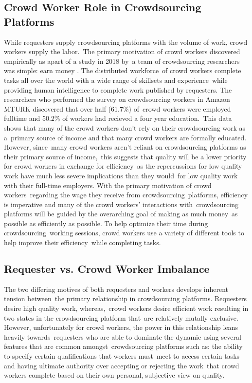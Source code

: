 \documentclass[letterpaper,12pt]{article}
\begin{document}
\subsection{Crowd Worker Role in Crowdsourcing Platforms}
While requesters supply crowdsourcing platforms with the volume of work, crowd workers supply the labor.\
The primary motivation of crowd workers discovered empirically as apart of a study in 2018 by\
a team of crowdsourcing researchers was simple: earn money \cite{Kaplan2018}. The distributed workforce\
of crowd workers complete tasks all over the world with a wide range of skillsets and experience\
while providing human intelligence to complete work published by requesters. The researchers
who performed the survey on crowdsourcing workers in Amazon MTURK discovered that over half (61.7\%) of\
crowd workers were employed fulltime and 50.2\% of workers had recieved a four year education.\cite{Kaplan2018}\
This data shows that many of the crowd workers don't rely on their crowdsourcing work as a\
primary source of income and that many crowd workers are formally educated. However, since\
many crowd workers aren't reliant on crowdsourcing platforms as their primary source of income,\
this suggests that quality will be a lower priority for crowd workers in exchange for efficiency\
as the repercussions for low quality work have much less severe implications than they would\
for low quality work with their full-time employers. With the primary motivation of crowd workers\
regarding the wage they receive from crowdsourcing\
platforms, efficiency is imperative and many of the crowd workers' interactions with\
crowdsourcing platforms will be guided by the overarching goal of making as much money\
as possible as efficiently as possible. To help optimize their time during crowdsourcing\
working sessions, crowd workers use a variety of different tools to help improve their efficiency\
while completing tasks.

\subsection{Requester vs. Crowd Worker Imbalance}
The two differing motives of both requesters and workers develops inherent tension between\
the primary relationship in crowdsourcing platforms. Requesters desire high quality work, whereas,\
crowd workers desire efficient work resulting in two states in the crowdsourcing platform that\
are relatively mutally exclusive. However, unfortunately for crowd workers, the power in this relationship leans heavily towards\
requesters who are able to dominate the dynamic using several features that are common amongst\
crowdsourcing platforms such as: the ability to specify certain qualifications that workers must\
meet to access certain tasks and having ultimate authority over accepting or rejecting the work\
that crowd workers complete based on their own personal, subjective view on quality. \cite{Kaplan2018,allahbakhsh2013quality}\
\end{document}
